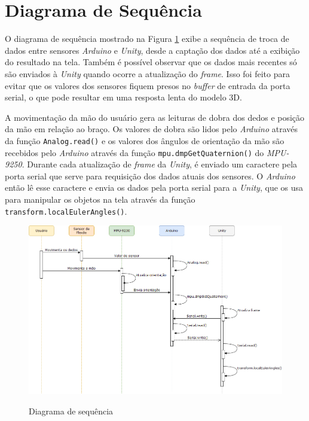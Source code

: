 \section{Diagrama de Sequência}
\label{sec:sequencia}
O diagrama de sequência mostrado na Figura \ref{fig:seq} exibe a sequência de troca de dados entre sensores \textit{Arduino} e \textit{Unity}, desde a captação dos dados até a exibição do resultado na tela. Também é possível observar que os dados mais recentes só são enviados à \textit{Unity} quando ocorre a atualização do \textit{frame}. Isso foi feito para evitar que os valores dos sensores fiquem presos no \textit{buffer} de entrada da porta serial, o que pode resultar em uma resposta lenta do modelo \ac{3D}.

A movimentação da mão do usuário gera as leituras de dobra dos dedos e posição da mão em relação ao braço. Os valores de dobra são lidos pelo \textit{Arduino} através da função \lstinline!Analog.read()! e os valores dos ângulos de orientação da mão são recebidos pelo \textit{Arduino} através da função \lstinline!mpu.dmpGetQuaternion()! do \textit{MPU-9250}. Durante cada atualização de \textit{frame} da \textit{Unity}, é enviado um caractere pela porta serial que serve para requisição dos dados atuais dos sensores. O \textit{Arduino} então lê esse caractere e envia os dados pela porta serial para a \textit{Unity}, que os usa para manipular os objetos na tela através da função \lstinline!transform.localEulerAngles()!.

\begin{figure}[H]
  \setlength{\abovecaptionskip}{0pt}
  \setlength{\belowcaptionskip}{0pt}
  \caption[Diagrama de sequência]{Diagrama de sequência}
  \centering
  \includegraphics[width=\textwidth]{imagem/sequencia}
  \captionsetup{justification=centering}
  \label{fig:seq}
\end{figure}

